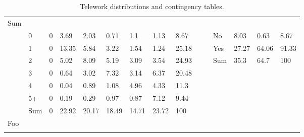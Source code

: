\begin{center}
\begin{landscape}
\begin{longtable}{lllllllllllllll}
  Sum \\
 &
  0 &
  \cellcolor[HTML]{FFFFFF}0 &
  \cellcolor[HTML]{E7E7E7}3.69 &
  \cellcolor[HTML]{F2F2F2}2.03 &
  \cellcolor[HTML]{FBFBFB}0.71 &
  \cellcolor[HTML]{F8F8F8}1.1 &
  \cellcolor[HTML]{F8F8F8}1.13 &
  8.67 &
   &
   &
  No &
  \cellcolor[HTML]{F5F5F5}8.03 &
  \cellcolor[HTML]{FFFFFF}0.63 &
  8.67 \\
 &
  1 &
  \cellcolor[HTML]{FFFFFF}0 &
  \cellcolor[HTML]{A6A6A6}13.35 &
  \cellcolor[HTML]{D9D9D9}5.84 &
  \cellcolor[HTML]{EAEAEA}3.22 &
  \cellcolor[HTML]{F5F5F5}1.54 &
  \cellcolor[HTML]{F7F7F7}1.24 &
  25.18 &
   &
   &
  Yes &
  \cellcolor[HTML]{DADADA}27.27 &
  \cellcolor[HTML]{A6A6A6}64.06 &
  91.33 \\
 &
  2 &
  \cellcolor[HTML]{FFFFFF}0 &
  \cellcolor[HTML]{DEDEDE}5.02 &
  \cellcolor[HTML]{CACACA}8.09 &
  \cellcolor[HTML]{DDDDDD}5.19 &
  \cellcolor[HTML]{EBEBEB}3.09 &
  \cellcolor[HTML]{E8E8E8}3.54 &
  24.93 &
   &
   &
  Sum &
  35.3 &
  64.7 &
  100 \\
 &
  3 &
  \cellcolor[HTML]{FFFFFF}0 &
  \cellcolor[HTML]{FBFBFB}0.64 &
  \cellcolor[HTML]{EBEBEB}3.02 &
  \cellcolor[HTML]{CFCFCF}7.32 &
  \cellcolor[HTML]{EBEBEB}3.14 &
  \cellcolor[HTML]{D5D5D5}6.37 &
  20.48 &
   &
   &
   &
   &
   &
    \\
 &
  4 &
  \cellcolor[HTML]{FFFFFF}0 &
  \cellcolor[HTML]{FFFFFF}0.04 &
  \cellcolor[HTML]{FAFAFA}0.89 &
  \cellcolor[HTML]{F8F8F8}1.08 &
  \cellcolor[HTML]{DEDEDE}4.96 &
  \cellcolor[HTML]{E3E3E3}4.33 &
  11.3 &
   &
   &
   &
   &
   &
    \\
 &
  5+ &
  \cellcolor[HTML]{FFFFFF}0 &
  \cellcolor[HTML]{FEFEFE}0.19 &
  \cellcolor[HTML]{FEFEFE}0.29 &
  \cellcolor[HTML]{F9F9F9}0.97 &
  \cellcolor[HTML]{FAFAFA}0.87 &
  \cellcolor[HTML]{D0D0D0}7.12 &
  9.44 &
   &
   &
   &
   &
   &
    \\
  &
  Sum &
  0 &
  22.92 &
  20.17 &
  18.49 &
  14.71 &
  23.72 &
  100 &
    &
    &
    &
    &
    &
    \\
  \bottomrule
\multicolumn{15}{l}{Foo}\\
\caption{\label{tab:wfh-table-weighted-combined} Telework distributions and contingency tables.}
\end{longtable}
\end{landscape}
\end{center}
